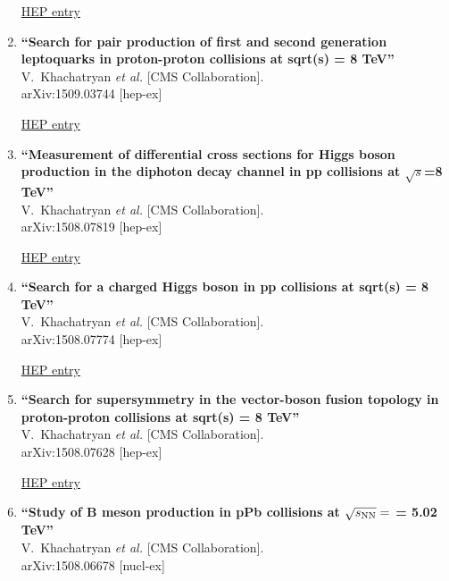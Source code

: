 \documentclass{article}
\begin{document}
\begin{enumerate}
\href{http://inspirehep.net/record/1393258}{HEP entry}



\item%
{\bf ``Search for pair production of first and second generation leptoquarks in proton-proton collisions at sqrt(s) = 8 TeV''}
  \\{}V.~Khachatryan {\it et al.} [CMS Collaboration].
  \\{}arXiv:1509.03744 [hep-ex]
  
\href{http://inspirehep.net/record/1393257}{HEP entry}


\item%
{\bf ``Measurement of differential cross sections for Higgs boson production in the diphoton decay channel in pp collisions at $\sqrt{s}$=8 TeV''}
  \\{}V.~Khachatryan {\it et al.} [CMS Collaboration].
  \\{}arXiv:1508.07819 [hep-ex]
  
\href{http://inspirehep.net/record/1391147}{HEP entry}


\item%
{\bf ``Search for a charged Higgs boson in pp collisions at sqrt(s) = 8 TeV''}
  \\{}V.~Khachatryan {\it et al.} [CMS Collaboration].
  \\{}arXiv:1508.07774 [hep-ex]
  
\href{http://inspirehep.net/record/1391146}{HEP entry}


\item%
{\bf ``Search for supersymmetry in the vector-boson fusion topology in proton-proton collisions at sqrt(s) = 8 TeV''}
  \\{}V.~Khachatryan {\it et al.} [CMS Collaboration].
  \\{}arXiv:1508.07628 [hep-ex]
  
\href{http://inspirehep.net/record/1391140}{HEP entry}



\item%
{\bf ``Study of B meson production in pPb collisions at $\sqrt{s_{ \rm{NN}}} =$ = 5.02 TeV''}
  \\{}V.~Khachatryan {\it et al.} [CMS Collaboration].
  \\{}arXiv:1508.06678 [nucl-ex]
  

\end{enumerate}
\end{document}
